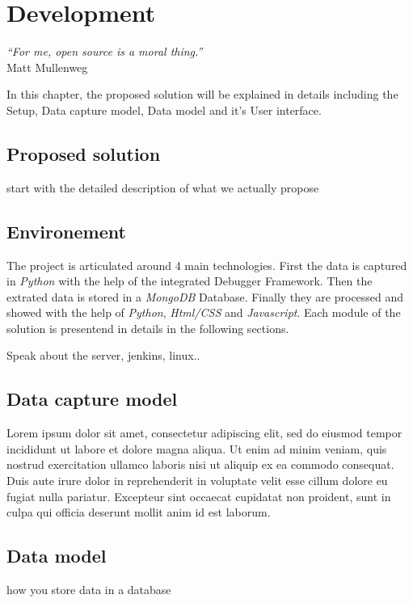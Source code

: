 
\chapter{Development} %
\label{chap:development}
\begin{flushright}
\textit{``For me, open source is a moral thing.''} \\ Matt Mullenweg
\end{flushright}

In this chapter, the proposed solution will be explained in details including the Setup, Data capture model, Data model and it's User interface.


\section{Proposed solution}
start with the detailed description of what we actually propose

\section{Environement}
The project is articulated around 4 main technologies. First the data is captured in \textit{Python} with the help of the integrated Debugger Framework. Then the extrated data is stored in a \textit{MongoDB} Database. Finally they are processed and showed with the help of \textit{Python}, \textit{Html/CSS} and \textit{Javascript}. Each module of the solution is presentend in details in the following sections. 

Speak about the server, jenkins, linux..

\section{Data capture model}
Lorem ipsum dolor sit amet, consectetur adipiscing elit, sed do eiusmod tempor incididunt ut labore et dolore magna aliqua. Ut enim ad minim veniam, quis nostrud exercitation ullamco laboris nisi ut aliquip ex ea commodo consequat. Duis aute irure dolor in reprehenderit in voluptate velit esse cillum dolore eu fugiat nulla pariatur. Excepteur sint occaecat cupidatat non proident, sunt in culpa qui officia deserunt mollit anim id est laborum.

\section{Data model}
how you store data in a database


